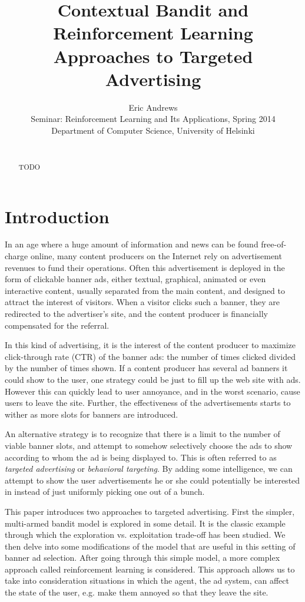 \documentclass{article} %
\title{Contextual Bandit and Reinforcement Learning Approaches to Targeted
Advertising}
\author{
Eric Andrews \\
Seminar: Reinforcement Learning and Its Applications, Spring 2014 \\
Department of Computer Science, University of Helsinki\\\\
}
\begin{document}
\maketitle

\begin{abstract}
  TODO
\end{abstract}

\section{Introduction}

In an age where a huge amount of information and news can be found
free-of-charge online, many content producers on the Internet rely on
advertisement revenues to fund their operations. Often this advertisement is
deployed in the form of clickable banner ads, either textual, graphical,
animated or even interactive content, usually separated from the main content,
and designed to attract the interest of visitors. When a visitor clicks such a
banner, they are redirected to the advertiser's site, and the content producer
is financially compensated for the referral.

In this kind of advertising, it is the interest of the content producer to
maximize click-through rate (CTR) of the banner ads: the number of times
clicked divided by the number of times shown. If a content producer has several
ad banners it could show to the user, one strategy could be just to fill up the
web site with ads. However this can quickly lead to user annoyance, and in the
worst scenario, cause users to leave the site. Further, the effectiveness of
the advertisements starts to wither as more slots for banners are introduced.

An alternative strategy is to recognize that there is a limit to the number of
viable banner slots, and attempt to somehow selectively choose the ads to show
according to whom the ad is being displayed to. This is often referred to as
\emph{targeted advertising} or \emph{behavioral targeting}. By adding some
intelligence, we can attempt to show the user advertisements he or she could
potentially be interested in instead of just uniformly picking one out of a
bunch.



This paper introduces two approaches to targeted advertising. First the
simpler, multi-armed bandit model is explored in some detail. It is the classic
example through which the exploration vs.  exploitation trade-off has been
studied. We then delve into some modifications of the model that are useful in
this setting of banner ad selection. After going through this simple model, a
more complex approach called reinforcement learning is considered. This
approach allows us to take into consideration situations in which the agent,
the ad system, can affect the state of the user, e.g. make them annoyed so that
they leave the site.
\end{document}
